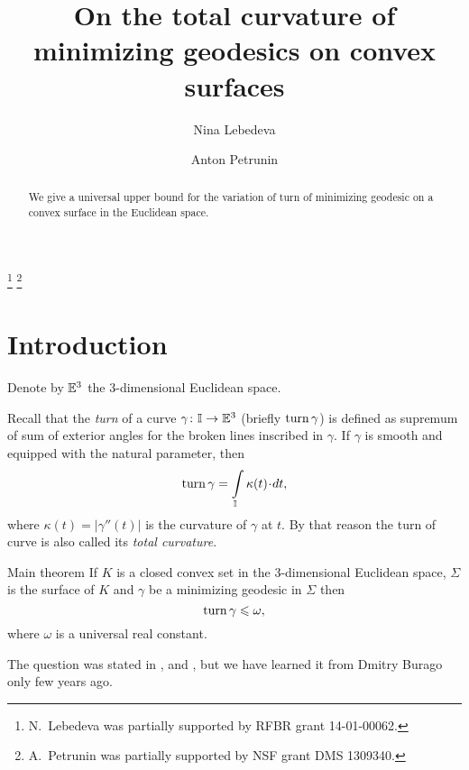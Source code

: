 \documentclass[a4paper,10pt]{amsart}
\begin{document}
\title{On the total curvature of \\
minimizing geodesics on convex surfaces}
\author{Nina Lebedeva}
\address{N. Lebedeva\newline\vskip-4mm
Math. Dept.
St. Petersburg State University,
Universitetsky pr., 28, 
Stary Peterhof, 
198504, Russia.
\newline\vskip-4mm
Steklov Institute,
27 Fontanka, St. Petersburg, 
191023, Russia.}
\author{Anton Petrunin}
\address{A. Petrunin\newline\vskip-4mm
Math. Dept. PSU,
University Park, PA 16802,
USA}
\thanks{N.~Lebedeva was partially supported by RFBR grant 
14-01-00062.}
\thanks{A.~Petrunin was partially supported by NSF grant DMS 1309340.}


\date{}

\begin{abstract}
We give a universal upper bound for the variation of turn of minimizing geodesic on a convex surface in the Euclidean space.
\end{abstract}
\maketitle


\section{Introduction}

Denote by $\mathbb{E}^3$ the 3-dimensional Euclidean space.

Recall that the \emph{turn} of a curve $\gamma\colon\mathbb{I}\to \mathbb{E}^3$ 
(briefly $\mathop{\rm turn}\nolimits\gamma$)
is defined as supremum of sum of exterior angles 
for the broken lines inscribed in $\gamma$.
If $\gamma$ is smooth and equipped with the natural parameter, 
then 
\[\turn\gamma=\int\limits_\II \kappa(t)\cdot dt,\]
where $\kappa(t)=|\gamma''(t)|$ is the curvature of $\gamma$ at $t$.
By that reason the turn of curve is also called its \emph{total curvature}.

\begin{thm}{Main theorem}\label{thm:main}
If $K$ is a closed convex set in the 3-dimensional Euclidean space,
$\Sigma$ is the surface of $K$ 
and $\gamma$ be a minimizing geodesic in $\Sigma$
then 
\[\mathop{\rm turn}\nolimits\gamma\leqslant \omega,\]
where $\omega$ is a universal real constant.
\end{thm}

The question was stated in \cite{AH-PSV}, \cite{pach} and \cite{BKZ},
but we have learned it from Dmitry Burago only few years ago.
\end{document}
